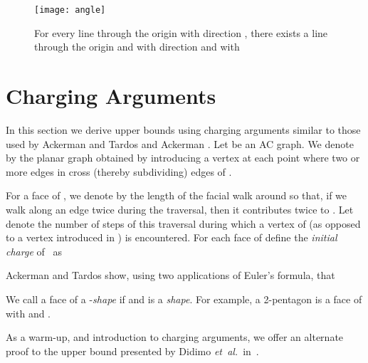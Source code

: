 \documentclass{patmorin}
\newcommand{\etal}{\emph{et~al.}}
\newcommand{\seclabel}[1]{\label{sec:#1}}
\newcommand{\figlabel}[1]{\label{fig:#1}}
\begin{document}
\begin{figure}
  \begin{center}
    \texttt{[image: angle]}
  \end{center}
  \caption{For every line  through the origin with direction
, there exists a line  through the origin and  with
direction  and with }
  \figlabel{angle}
\end{figure}





\section{Charging Arguments}
\seclabel{charging}

In this section we derive upper bounds using charging arguments similar
to those used by Ackerman and Tardos \cite{at-mneqp-07} and Ackerman
\cite{a-mnetg-09}.  Let  be an AC graph.  We denote by 
the planar graph obtained by introducing a vertex at each point where
two or more edges in  cross (thereby subdividing) edges of .

For a face  of , we denote by  the length of the facial walk around 
so that, if we walk along an edge twice during the traversal, then it contributes twice to
.  Let  denote the number of steps of this traversal during
which a vertex of  (as opposed to a vertex introduced in ) is
encountered.  For each face  of  define the \emph{initial charge}
of~ as

Ackerman and Tardos show, using two applications of Euler's formula, that

We call a face  of  a -\emph{shape} if  and  is a
\emph{shape}.  For example, a 2-pentagon is a face of  with  and
.

As a warm-up, and introduction to charging arguments, we offer an alternate
proof to the upper bound presented by Didimo \etal\ in~\cite{del-dgrac-09}.
\end{document}

